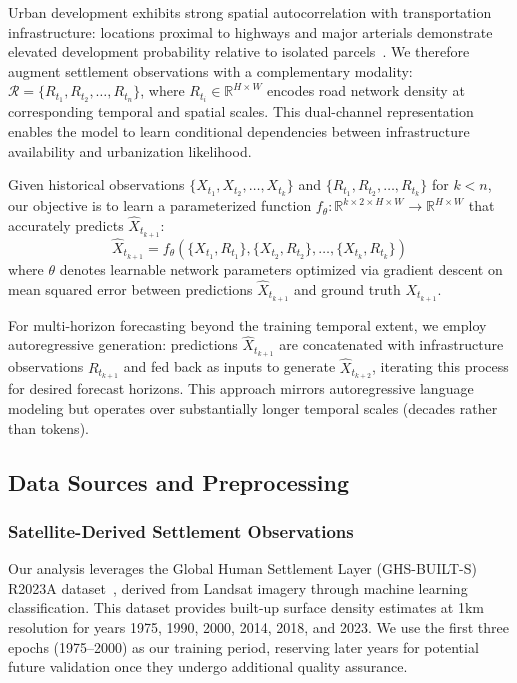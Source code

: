\documentclass[conference]{IEEEtran}
\begin{document}
Urban development exhibits strong spatial autocorrelation with transportation infrastructure: locations proximal to highways and major arterials demonstrate elevated development probability relative to isolated parcels~\cite{alkheder2008}. We therefore augment settlement observations with a complementary modality: $\mathcal{R} = \{R_{t_1}, R_{t_2}, \ldots, R_{t_n}\}$, where $R_{t_i} \in \mathbb{R}^{H \times W}$ encodes road network density at corresponding temporal and spatial scales. This dual-channel representation enables the model to learn conditional dependencies between infrastructure availability and urbanization likelihood.

Given historical observations $\{X_{t_1}, X_{t_2}, \ldots, X_{t_k}\}$ and $\{R_{t_1}, R_{t_2}, \ldots, R_{t_k}\}$ for $k < n$, our objective is to learn a parameterized function $f_\theta: \mathbb{R}^{k \times 2 \times H \times W} \rightarrow \mathbb{R}^{H \times W}$ that accurately predicts $\hat{X}_{t_{k+1}}$:
\begin{equation}
\hat{X}_{t_{k+1}} = f_\theta(\{X_{t_1}, R_{t_1}\}, \{X_{t_2}, R_{t_2}\}, \ldots, \{X_{t_k}, R_{t_k}\})
\end{equation}
where $\theta$ denotes learnable network parameters optimized via gradient descent on mean squared error between predictions $\hat{X}_{t_{k+1}}$ and ground truth $X_{t_{k+1}}$.

For multi-horizon forecasting beyond the training temporal extent, we employ autoregressive generation: predictions $\hat{X}_{t_{k+1}}$ are concatenated with infrastructure observations $R_{t_{k+1}}$ and fed back as inputs to generate $\hat{X}_{t_{k+2}}$, iterating this process for desired forecast horizons. This approach mirrors autoregressive language modeling but operates over substantially longer temporal scales (decades rather than tokens).

\subsection{Data Sources and Preprocessing}

\subsubsection{Satellite-Derived Settlement Observations}
Our analysis leverages the Global Human Settlement Layer (GHS-BUILT-S) R2023A dataset~\cite{ghsl2023}, derived from Landsat imagery through machine learning classification. This dataset provides built-up surface density estimates at 1km resolution for years 1975, 1990, 2000, 2014, 2018, and 2023. We use the first three epochs (1975--2000) as our training period, reserving later years for potential future validation once they undergo additional quality assurance.
\end{document}
